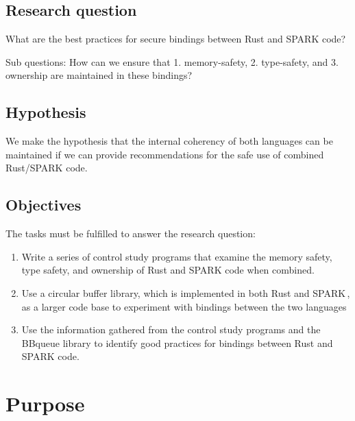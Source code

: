 \documentclass[nomenclature, english, bibtex]{kththesis}
\newcommand*{\generalExpl}[1]{\todo[inline]{#1}}
\newcommand*{\sweExpl}[1]{\todo[inline, backgroundcolor=kth-lightblue40]{#1}}  %
\begin{document}
\subsection{Research question}
\label{sec:researchQuestion}

What are the best practices for secure bindings between Rust and SPARK code?

Sub questions: How can we ensure that 1. \gls{memory-safety}, 2. \gls{type-safety}, and 3. \gls{ownership} are maintained in these bindings?

\subsection{Hypothesis}
We make the hypothesis that the internal coherency of both languages can be maintained if we can provide recommendations for the safe use of combined Rust/SPARK code.

\subsection{Objectives}
The tasks must be fulfilled to answer the research question:
\begin{enumerate}
    \item Write a series of control study programs that examine the memory safety, type safety, and ownership of Rust and SPARK code when combined.
    \item Use a circular buffer library, which is implemented in both Rust and SPARK\,\cite{munns_bbqueue_2022,chouteau_bbqueue_nodate}, as a larger code base to experiment with bindings between the two languages
    \item Use the information gathered from the control study programs and the BBqueue library to identify good practices for bindings between Rust and SPARK code.
\end{enumerate}


\section{Purpose}
\end{document}
